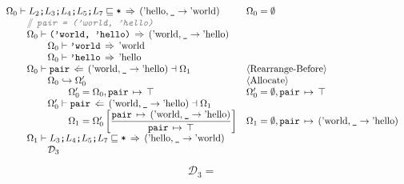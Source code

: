 \documentclass[12pt,twoside]{report}
\begin{document}
{\smaller
\[\begin{array}{ll}
  \Omega_0 \vdash L_2\mono{;}L_3\mono{;}L_4\mono{;}L_5\mono{;}L_7 \subtype \mono{*} \movearrowabs (\atom{hello}, \mono{\_} \rightarrow \atom{world}) &
  \Omega_0 = \emptyset \\

  \otab \ocomment{\mono{pair = ('world, 'hello)}} \\
  \otab \Omega_0 \vdash \mono{('world, 'hello)} \movearrowabs (\atom{world}, \mono{\_} \rightarrow \atom{hello}) \\
  \otab \otab \Omega_0 \vdash \mono{'world} \movearrowabs \atom{world} \\
  \otab \otab \Omega_0 \vdash \mono{'hello} \movearrowabs \atom{hello} \\
  \otab\Omega_0 \vdash \mono{pair} \writearrowabs (\atom{world}, \mono{\_} \rightarrow \atom{hello}) \dashv \Omega_1 &
   \langle\text{Rearrange-Before}\rangle \\
  \otab\otab \Omega_0 \rearrangearrow \Omega_0' &
   \langle\text{Allocate}\rangle \\
  \otab\otab\otab \Omega_0' = \Omega_0,\absmapm{pair}{\top} &
   \Omega_0' = \emptyset, \absmapm{pair}{\top} \\
  \otab \otab \Omega_0' \vdash \mono{pair} \writearrowabs (\atom{world}, \mono{\_} \rightarrow \atom{hello}) \dashv \Omega_1 \\
  \otab\otab\otab \Omega_1 = \Omega_0'\left[\dfrac{\absmapm{pair}{(\atom{world}, \mono{\_} \rightarrow \atom{hello})}}{\absmapm{pair}{\top}}\right] &
   \Omega_1 = \emptyset,\absmapm{pair}{(\atom{world}, \mono{\_} \rightarrow \atom{hello})}\\
  \otab \Omega_1 \vdash L_3\mono{;}L_4\mono{;}L_5\mono{;}L_7 \subtype \mono{*} \movearrowabs (\atom{hello}, \mono{\_} \rightarrow \atom{world}) \\
  \otab \otab \mathcal{D}_3 \\

\end{array}\]
\[\begin{array}{ll}
  \mathcal{D}_3 = \\\\


\end{array}\]}
\end{document}
